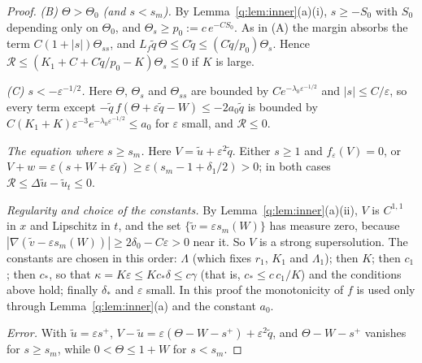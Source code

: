 \documentclass[11pt]{amsart}
\theoremstyle{definition}
\theoremstyle{remark}
\newcommand{\ve}{\varepsilon}
\begin{document}
\begin{proof}
\emph{(B) $\Theta>\Theta_0$ (and $s<s_m$).} By Lemma~\ref{q:lem:inner}(a)(i), $s\ge-S_0$ with
$S_0$ depending only on $\Theta_0$, and $\Theta_s\ge p_0:=c\,e^{-CS_0}$. As in (A) the margin
absorbs the term $C(1+|s|)\Theta_{ss}$, and $L_f\tilde q\,\Theta\le C\tilde q\le(C\tilde q/p_0)\Theta_s$. Hence
$\mathcal R\le(K_1+C+C\tilde q/p_0-K)\Theta_s\le0$ if $K$ is large.

\emph{(C) $s<-\ve^{-1/2}$.} Here $\Theta$, $\Theta_s$ and $\Theta_{ss}$ are bounded by
$Ce^{-\lambda_0\ve^{-1/2}}$ and $|s|\le C/\ve$, so every term except
$-\tilde q\,f(\Theta+\ve\tilde q-W)\le-2a_0\tilde q$ is bounded by
$C(K_1+K)\ve^{-3}e^{-\lambda_0\ve^{-1/2}}\le a_0$ for $\ve$ small, and $\mathcal R\le0$.

\emph{The equation where $s\ge s_m$.} Here $V=\tilde u+\ve^2\tilde q$. Either $s\ge1$ and
$f_\ve(V)=0$, or $V+w=\ve(s+W+\ve\tilde q)\ge\ve(s_m-1+\delta_1/2)>0$; in both cases
$\mathcal R\le\Delta\tilde u-\tilde u_t\le0$.

\emph{Regularity and choice of the constants.} By Lemma~\ref{q:lem:inner}(a)(ii), $V$ is
$C^{1,1}$ in $x$ and Lipschitz in $t$, and the set $\{\tilde v=\ve s_m(W)\}$ has measure zero,
because $|\nabla(\tilde v-\ve s_m(W))|\ge2\delta_0-C\ve>0$ near it. So $V$ is a strong
supersolution. The constants are chosen in this order: $\Lambda$ (which fixes $r_1$, $K_1$
and $\Lambda_1$); then $K$; then $c_1$; then $c_*$, so that $\kappa=K\ve\le Kc_*\delta\le c\gamma$
(that is, $c_*\le c\,c_1/K$) and the
conditions above hold; finally $\delta_*$ and $\ve$ small. In this proof the monotonicity of
$f$ is used only through Lemma~\ref{q:lem:inner}(a) and the constant $a_0$.

\emph{Error.} With $\tilde u=\ve s^+$, $V-\tilde u=\ve(\Theta-W-s^+)+\ve^2\tilde q$, and
$\Theta-W-s^+$ vanishes for $s\ge s_m$, while $0<\Theta\le1+W$ for $s<s_m$.
\end{proof}
\end{document}
